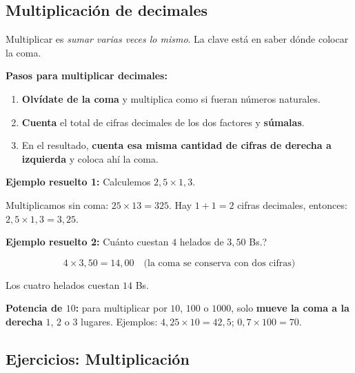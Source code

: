 \documentclass[12pt, letterpaper]{article}
\begin{document}
\vspace{6pt}

\subsection{Multiplicación de decimales}

Multiplicar es \emph{sumar varias veces lo mismo}. La clave está en saber dónde colocar la coma.

\begin{cuadropasos}
  \textbf{Pasos para multiplicar decimales:}
  \begin{enumerate}
    \item \textbf{Olvídate de la coma} y multiplica como si fueran números naturales.
    \item \textbf{Cuenta} el total de cifras decimales de los dos factores y \textbf{súmalas}.
    \item En el resultado, \textbf{cuenta esa misma cantidad de cifras de derecha a izquierda} y coloca ahí la coma.
  \end{enumerate}
\end{cuadropasos}

\noindent\textbf{Ejemplo resuelto 1:} Calculemos $2{,}5 \times 1{,}3$.

Multiplicamos sin coma: $25 \times 13 = 325$. Hay $1 + 1 = 2$ cifras decimales, entonces: $2{,}5 \times 1{,}3 = 3{,}25$.

\noindent\textbf{Ejemplo resuelto 2:} \textquestiondown Cuánto cuestan $4$ helados de $3{,}50$ Bs.?

\[
  4 \times 3{,}50 = 14{,}00 \quad\text{(la coma se conserva con dos cifras)}
\]

\noindent Los cuatro helados cuestan $14$ Bs.

\begin{cuadroadvertencia}
  \textbf{Potencia de $10$:} para multiplicar por $10$, $100$ o $1000$, solo \textbf{mueve la coma a la derecha} $1$, $2$ o $3$ lugares. Ejemplos: $4{,}25 \times 10 = 42{,}5$; \quad $0{,}7 \times 100 = 70$.
\end{cuadroadvertencia}

\subsection{Ejercicios: Multiplicación}
\end{document}
